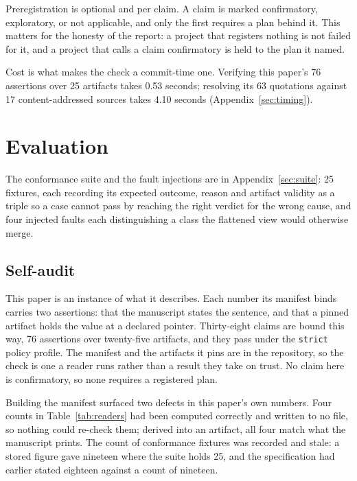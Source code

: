 \documentclass{article}
\newcommand{\code}[1]{\texttt{#1}}
\begin{document}
Preregistration is optional and per claim. A claim is marked confirmatory, exploratory, or not
applicable, and only the first requires a plan behind it. This matters for the honesty of the
report: a project that registers nothing is not failed for it, and a project that calls a claim
confirmatory is held to the plan it named.

Cost is what makes the check a commit-time one. Verifying this paper's 76 assertions over 25 artifacts takes 0.53 seconds; resolving its
63 quotations against 17 content-addressed sources takes 4.10 seconds
(Appendix~\ref{sec:timing}).

\section{Evaluation}
\label{sec:eval}

The conformance suite and the fault injections are in Appendix~\ref{sec:suite}: 25 fixtures,
each recording its expected outcome, reason and artifact validity as a triple so a case
cannot pass by reaching the right verdict for the wrong cause, and four injected faults each
distinguishing a class the flattened view would otherwise merge.

\subsection{Self-audit}
\label{sec:selfaudit}

This paper is an instance of what it describes. Each number its manifest binds carries two assertions: that the manuscript states
the sentence, and that a pinned artifact holds the value at a declared pointer. Thirty-eight claims are
bound this way, 76 assertions over twenty-five artifacts, and they pass under the \code{strict} policy
profile. The manifest and the artifacts it pins are in the repository, so the check is one a
reader runs rather than a result they take on trust. No claim here is confirmatory, so none requires a
registered plan.

Building the manifest surfaced two defects in this paper's own numbers. Four counts in
Table~\ref{tab:readers} had been computed correctly and written to no file, so nothing could
re-check them; derived into an artifact, all four match what the manuscript prints. The count of
conformance fixtures was recorded and stale: a stored figure gave nineteen where the suite holds
25, and the specification had earlier stated eighteen against a count of nineteen.
\end{document}
